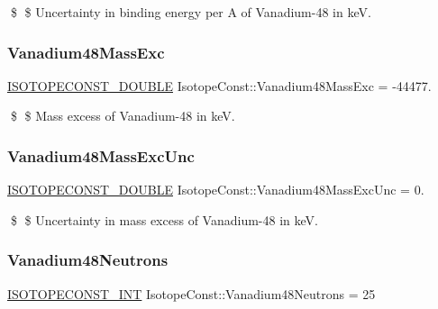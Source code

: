 \$ \$ Uncertainty in binding energy per A of Vanadium-\/48 in keV. \mbox{\label{group___isotope_const-_vanadium-_v48_ga69c17eded9f06c1259cfb309fd2d0a89}} 
\subsubsection{\texorpdfstring{Vanadium48\+Mass\+Exc}{Vanadium48MassExc}}
{\footnotesize\ttfamily \mbox{\hyperlink{group___isotope_const-_macros_ga8f45a7272ce02c0b4c65c44636ed719a}{I\+S\+O\+T\+O\+P\+E\+C\+O\+N\+S\+T\+\_\+\+D\+O\+U\+B\+LE}} Isotope\+Const\+::\+Vanadium48\+Mass\+Exc = -\/44477.}

\$ \$ Mass excess of Vanadium-\/48 in keV. \mbox{\label{group___isotope_const-_vanadium-_v48_ga8c98126b94087a1ee4b93d479c573f7c}} 
\subsubsection{\texorpdfstring{Vanadium48\+Mass\+Exc\+Unc}{Vanadium48MassExcUnc}}
{\footnotesize\ttfamily \mbox{\hyperlink{group___isotope_const-_macros_ga8f45a7272ce02c0b4c65c44636ed719a}{I\+S\+O\+T\+O\+P\+E\+C\+O\+N\+S\+T\+\_\+\+D\+O\+U\+B\+LE}} Isotope\+Const\+::\+Vanadium48\+Mass\+Exc\+Unc = 0.}

\$ \$ Uncertainty in mass excess of Vanadium-\/48 in keV. \mbox{\label{group___isotope_const-_vanadium-_v48_ga820d0ee2351c72d8e9d5c85c580d3145}} 
\subsubsection{\texorpdfstring{Vanadium48\+Neutrons}{Vanadium48Neutrons}}
{\footnotesize\ttfamily \mbox{\hyperlink{group___isotope_const-_macros_ga5f18360b3e99483a35c32d789e62621c}{I\+S\+O\+T\+O\+P\+E\+C\+O\+N\+S\+T\+\_\+\+I\+NT}} Isotope\+Const\+::\+Vanadium48\+Neutrons = 25}

